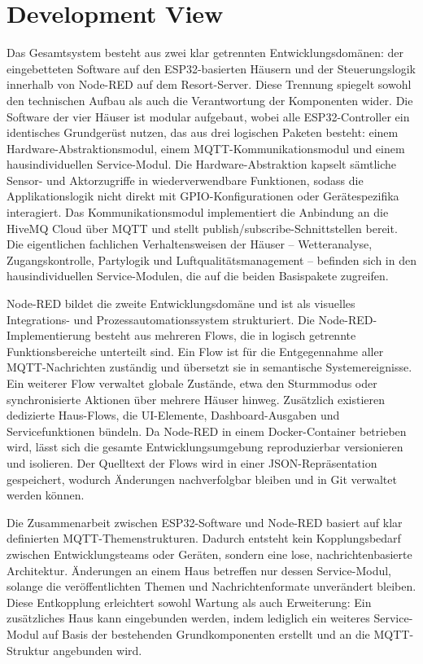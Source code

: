 \section{Development View}
Das Gesamtsystem besteht aus zwei klar getrennten Entwicklungsdomänen: der eingebetteten Software auf den ESP32-basierten Häusern und der Steuerungslogik innerhalb von Node-RED auf dem Resort-Server. Diese Trennung spiegelt sowohl den technischen Aufbau als auch die Verantwortung der Komponenten wider. Die Software der vier Häuser ist modular aufgebaut, wobei alle ESP32-Controller ein identisches Grundgerüst nutzen, das aus drei logischen Paketen besteht: einem Hardware-Abstraktionsmodul, einem MQTT-Kommunikationsmodul und einem hausindividuellen Service-Modul. Die Hardware-Abstraktion kapselt sämtliche Sensor- und Aktorzugriffe in wiederverwendbare Funktionen, sodass die Applikationslogik nicht direkt mit GPIO-Konfigurationen oder Gerätespezifika interagiert. Das Kommunikationsmodul implementiert die Anbindung an die HiveMQ Cloud über MQTT und stellt publish/subscribe-Schnittstellen bereit. Die eigentlichen fachlichen Verhaltensweisen der Häuser – Wetteranalyse, Zugangskontrolle, Partylogik und Luftqualitätsmanagement – befinden sich in den hausindividuellen Service-Modulen, die auf die beiden Basispakete zugreifen.

Node-RED bildet die zweite Entwicklungsdomäne und ist als visuelles Integrations- und Prozessautomationssystem strukturiert. Die Node-RED-Implementierung besteht aus mehreren Flows, die in logisch getrennte Funktionsbereiche unterteilt sind. Ein Flow ist für die Entgegennahme aller MQTT-Nachrichten zuständig und übersetzt sie in semantische Systemereignisse. Ein weiterer Flow verwaltet globale Zustände, etwa den Sturmmodus oder synchronisierte Aktionen über mehrere Häuser hinweg. Zusätzlich existieren dedizierte Haus-Flows, die UI-Elemente, Dashboard-Ausgaben und Servicefunktionen bündeln. Da Node-RED in einem Docker-Container betrieben wird, lässt sich die gesamte Entwicklungsumgebung reproduzierbar versionieren und isolieren. Der Quelltext der Flows wird in einer JSON-Repräsentation gespeichert, wodurch Änderungen nachverfolgbar bleiben und in Git verwaltet werden können.

Die Zusammenarbeit zwischen ESP32-Software und Node-RED basiert auf klar definierten MQTT-Themenstrukturen. Dadurch entsteht kein Kopplungsbedarf zwischen Entwicklungsteams oder Geräten, sondern eine lose, nachrichtenbasierte Architektur. Änderungen an einem Haus betreffen nur dessen Service-Modul, solange die veröffentlichten Themen und Nachrichtenformate unverändert bleiben. Diese Entkopplung erleichtert sowohl Wartung als auch Erweiterung: Ein zusätzliches Haus kann eingebunden werden, indem lediglich ein weiteres Service-Modul auf Basis der bestehenden Grundkomponenten erstellt und an die MQTT-Struktur angebunden wird.

